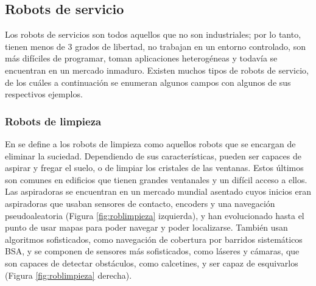 \setcounter{footnote}{5} %


\subsection{Robots de servicio}
\label{subsec:robotservicio}

Los robots de servicios son todos aquellos que no son industriales; por lo tanto, tienen menos de 3 grados de libertad, no trabajan en un entorno controlado, son más difíciles de programar, toman aplicaciones heterogéneas y todavía se encuentran en un mercado inmaduro. Existen muchos tipos de robots de servicio, de los cuáles a continuación se enumeran algunos campos con algunos de sus respectivos ejemplos.


\subsubsection{Robots de limpieza}
\label{subsubsec:robotlimpieza}

En \cite{plaza_robotica_servicio} se define a los robots de limpieza como aquellos robots que se encargan de eliminar la suciedad. Dependiendo de sus características, pueden ser capaces de aspirar y fregar el suelo, o de limpiar los cristales de las ventanas. Estos últimos son comunes en edificios que tienen grandes ventanales y un difícil acceso a ellos. Las aspiradoras se encuentran en un mercado mundial asentado cuyos inicios eran aspiradoras que usaban sensores de contacto, encoders y una navegación pseudoaleatoria (Figura \ref{fig:roblimpieza} izquierda), y han evolucionado hasta el punto de usar mapas para poder navegar y poder localizarse. También usan algoritmos sofisticados, como navegación de cobertura por barridos sistemáticos \acs{BSA}, y se componen de sensores más sofisticados, como láseres y cámaras, que son capaces de detectar obstáculos, como calcetines, y ser capaz de esquivarlos (Figura \ref{fig:roblimpieza} derecha).


